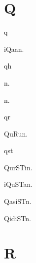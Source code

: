 \begin{multicols*}{2}
\section*{Q}

\begin{dictroot}{q}{\bigglot}
    \begin{dictentry}{iQaa\bigglot}{n.}
    \end{dictentry}
\end{dictroot}

\begin{dictroot}{q}{h}
    \begin{dictentry}{}{n.}
    \end{dictentry}
    \begin{dictentry}{}{n.}
    \end{dictentry}
\end{dictroot}

\begin{dictroot}{q}{r}
    \begin{dictentry}{QuRu}{n.}
    \end{dictentry}
\end{dictroot}

\begin{dictroot}{q}{st}
    \begin{dictentry}{QurSTi}{n.}
    \end{dictentry}
    \begin{dictentry}{iQuSTa}{n.}
    \end{dictentry}
    \begin{dictentry}{QasiST}{n.}
    \end{dictentry}
    \begin{dictentry}{QidiST}{n.}
    \end{dictentry}
\end{dictroot}

\section*{R}


\end{multicols*}
